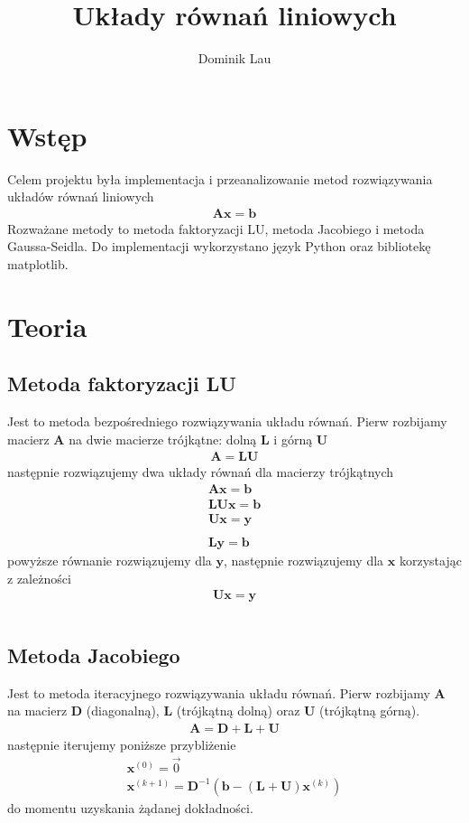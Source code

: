 \documentclass{article}
\title{Układy równań liniowych}
\author{Dominik Lau}
\begin{document}
\maketitle
\section{Wstęp}
Celem projektu była implementacja i przeanalizowanie metod rozwiązywania układów równań liniowych
\begin{gather*}
	\boldsymbol{A}\boldsymbol{x} = \boldsymbol{b}
\end{gather*}
Rozważane metody to metoda faktoryzacji LU, metoda Jacobiego i metoda Gaussa-Seidla.  
Do implementacji wykorzystano język Python oraz bibliotekę matplotlib.
\section{Teoria}
\subsection*{Metoda faktoryzacji LU}
Jest to metoda bezpośredniego rozwiązywania układu równań.  Pierw rozbijamy macierz $\textbf{A}$
na dwie macierze trójkątne: dolną $\textbf{L}$ i górną $\textbf{U}$
\begin{gather*}
	\boldsymbol{A} = \boldsymbol{L}\boldsymbol{U}
\end{gather*}
następnie rozwiązujemy dwa układy równań dla macierzy trójkątnych
\begin{gather*}
	\boldsymbol{A}\boldsymbol{x} = \boldsymbol{b}\\
	 \boldsymbol{L} \boldsymbol{U}  \boldsymbol{x} =  \boldsymbol{b} \\
	 \boldsymbol{Ux} =  \boldsymbol{y}  \\\\
	 \boldsymbol{L}  \boldsymbol{y} =   \boldsymbol{b}
\end{gather*}
powyższe równanie rozwiązujemy dla $ \boldsymbol{y}$, następnie rozwiązujemy dla $\boldsymbol{x}$
korzystając z zależności
\begin{gather*}
	\boldsymbol{Ux} =  \boldsymbol{y}  \\\\
\end{gather*}
\subsection*{Metoda Jacobiego}
Jest to metoda iteracyjnego rozwiązywania układu równań. Pierw rozbijamy $\boldsymbol{A}$
na macierz $\boldsymbol{D}$ (diagonalną), $\boldsymbol{L}$ (trójkątną dolną) oraz $\boldsymbol{U}$ 
(trójkątną górną).
\begin{gather*}
	\boldsymbol{A} = \boldsymbol{D} + \boldsymbol{L} + \boldsymbol{U}
\end{gather*}
następnie iterujemy poniższe przybliżenie
\begin{gather*}
	\boldsymbol{x}^{(0)} = \vec{0} \\
	\boldsymbol{x}^{(k+1)} = \boldsymbol{D}^{-1}(\boldsymbol{b} - (
\boldsymbol{L} + \boldsymbol{U})\boldsymbol{x}^{(k)})
\end{gather*}
do momentu uzyskania żądanej dokładności.
\end{document}
